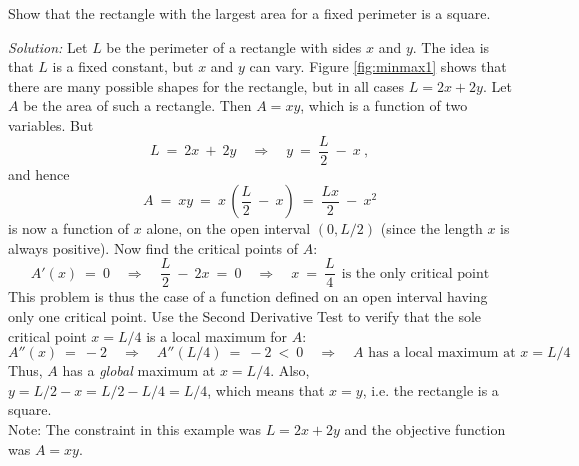 \begin{exmp}\label{exmp:minmax1}
 \piccaption[]{\label{fig:minmax1}}
\noindent Show that the rectangle with the largest area for a fixed perimeter is
 a square.\vspace{1mm}
\par\noindent\emph{Solution:} Let $L$ be the perimeter of a rectangle with sides
$x$ and $y$. The idea is that $L$ is a fixed constant, but $x$ and $y$ can vary.
Figure \ref{fig:minmax1} shows that there are many possible shapes
for the rectangle, but in all cases $L = 2x + 2y$. Let $A$ be the area of such a
rectangle. Then $A = xy$, which is a function of two variables. But
\[
L ~=~ 2x ~+~ 2y \quad\Rightarrow\quad y ~=~ \frac{L}{2} ~-~ x ~,
\]
and hence
\[
A ~=~ xy ~=~ x\,\left(\frac{L}{2} ~-~ x\right) ~=~ \frac{Lx}{2} ~-~ x^2
\]
is now a function of $x$ alone, on the open interval $(0,L/2)$ (since the length
$x$ is always positive). Now find the critical points of $A$:
\[
A'(x) ~=~ 0 \quad\Rightarrow\quad \frac{L}{2} ~-~ 2x ~=~ 0
\quad\Rightarrow\quad x ~=~ \frac{L}{4} ~~\text{is the only critical point}
\]
This problem is thus the case of a function defined on an open interval having
only one critical point. Use the Second Derivative Test to verify that the sole
critical point $x=L/4$ is a local maximum for $A$:
\[
A''(x) ~=~ -2 \quad\Rightarrow\quad A''(L/4) ~=~ -2 ~<~ 0
\quad\Rightarrow\quad\text{$A$ has a local maximum at $x = L/4$}
\]
Thus, $A$ has a \emph{global} maximum at $x=L/4$. Also, $y = L/2 - x = L/2 - L/4
= L/4$, which means that $x = y$, i.e. the rectangle is a square.\\Note: The
constraint in this example was $L=2x+2y$ and the objective function was $A=xy$.
\end{exmp}
